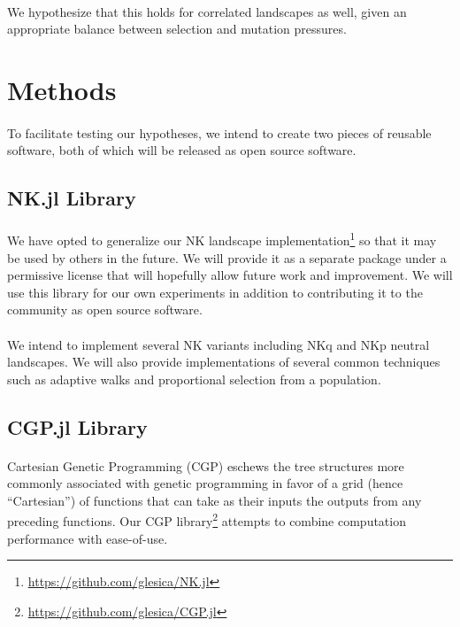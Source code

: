 \documentclass[12pt,letterpaper,titlepage]{article}
\begin{document}
\paragraph{}
We hypothesize that this holds for correlated landscapes as well, given an
appropriate balance between selection and mutation pressures.

\section{Methods}

\paragraph{}
To facilitate testing our hypotheses, we intend to create two pieces of
reusable software, both of which will be released as open source software.

\subsection{NK.jl Library}

\paragraph{}
We have opted to generalize our NK landscape
implementation\footnote{\url{https://github.com/glesica/NK.jl}} so that it may
be used by others in the future. We will provide it as a separate package under
a permissive license that will hopefully allow future work and improvement.  We
will use this library for our own experiments in addition to contributing it to
the community as open source software.

\paragraph{}
We intend to implement several NK variants including NKq and NKp neutral
landscapes. We will also provide implementations of several common techniques
such as adaptive walks and proportional selection from a population.

\subsection{CGP.jl Library}

\paragraph{}
Cartesian Genetic Programming (CGP) eschews the tree structures more commonly
associated with genetic programming in favor of a grid (hence ``Cartesian'') of
functions that can take as their inputs the outputs from any preceding
functions. Our CGP library\footnote{\url{https://github.com/glesica/CGP.jl}}
attempts to combine computation performance with ease-of-use.
\end{document}
